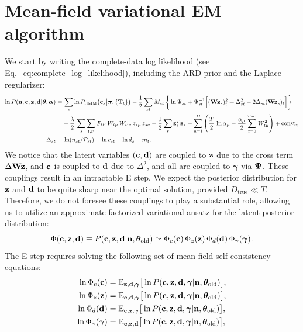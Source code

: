 \documentclass[nofootinbib,amssymb,amsmath]{revtex4}
\newcommand{\vd}{{\bf d}}
\newcommand{\vc}{{\bf c}}
\newcommand{\vz}{{\bf z}}
\newcommand{\vn}{{\bf n}}
\newcommand{\vW}{{\bf W}}
\newcommand{\vgamma}{{\bm \gamma}}
\newcommand{\vPsi}{{\bf \Psi}}
\newcommand{\vtheta}{{\boldsymbol \theta}}
\newcommand{\vpi}{{\boldsymbol \pi}}
\newcommand{\valpha}{{\boldsymbol \alpha}}
\newcommand{\PP}{\mathcal{P}}
\newcommand{\EE}{\mathbb{E}}
\begin{document}
\section{Mean-field variational EM algorithm}
We start by writing the complete-data log likelihood (see Eq.~\ref{eq:complete_log_likelihood}), including the ARD prior and the Laplace regularizer:
\begin{subequations}
\begin{align}
\label{eq:complete_log_likelihood}
\ln P(\vn, \vc, \vz, \vd | \vtheta, \valpha) =&\, \sum_{s} \ln P_\mathrm{HMM}\big(\vc_s \big|\vpi, \{\mathbf{T}_t\}\big) - \frac{1}{2}\sum_{st} M_{st} \, \bigg\{\ln \Psi_{st} + \Psi_{st}^{-1}\Big[(\vW \vz_s)_t^2 + \Delta_{st}^2 - 2\Delta_{st} (\vW \vz_s)_t\Big]\bigg\}\nonumber\\
& - \frac{\lambda}{2} \, \sum_s \sum_{t,t'} F_{tt'} \, W_{t\mu} \, W_{t'\nu} \, z_{s\mu} \, z_{s\nu} - \frac{1}{2}\sum_{s} \vz_s^T \vz_s + \sum_{\mu=1}^{D}\left(\frac{T}{2} \, \ln \alpha_\mu -\frac{\alpha_\mu}{2} \sum_{t=0}^{T-1} W_{t\mu}^2  \right) + \mathrm{const.},\\
\label{eq:delta_def}
\Delta_{st} \equiv&\, \ln(n_{st}/\PP_{st}) - \ln c_{st} - \ln d_s - m_t.
\end{align}
\end{subequations}
We notice that the latent variables $(\vc, \vd)$ are coupled to $\vz$ due to the cross term $\Delta \vW \vz$, and $\vc$ is coupled to $\vd$ due to $\Delta^2$, and all are coupled to $\vgamma$ via $\vPsi$. These couplings result in an intractable E step. We expect the posterior distribution for $\vz$ and $\vd$ to be quite sharp near the optimal solution, provided $D_\mathrm{true} \ll T$. Therefore, we do not foresee these couplings to play a substantial role, allowing us to utilize an approximate factorized variational ansatz for the latent posterior distribution:
\begin{equation}
\Phi(\vc, \vz, \vd) \equiv P(\vc, \vz, \vd | \vn, \vtheta_\mathrm{old}) \simeq \Phi_c(\vc) \, \Phi_z(\vz) \, \Phi_d(\vd) \, \Phi_\gamma(\vgamma).
\end{equation}
The E step requires solving the following set of mean-field self-consistency equations:
\begin{subequations}
\begin{align}
\ln \Phi_c(\vc) &= \EE_{\vz, \vd, \vgamma}\big[\ln P(\vc, \vz, \vd, \vgamma | \vn, \vtheta_\mathrm{old})\big],\\
\ln \Phi_z(\vz) &= \EE_{\vc, \vd, \vgamma}\big[\ln P(\vc, \vz, \vd, \vgamma | \vn, \vtheta_\mathrm{old})\big],\\
\ln \Phi_d(\vd) &= \EE_{\vc, \vz, \vgamma}\big[\ln P(\vc, \vz, \vd, \vgamma | \vn, \vtheta_\mathrm{old})\big],\\
\ln \Phi_\gamma(\vgamma) &= \EE_{\vc, \vz, \vd}\big[\ln P(\vc, \vz, \vd, \vgamma | \vn, \vtheta_\mathrm{old})\big],
\end{align}
\end{subequations}
\end{document}
